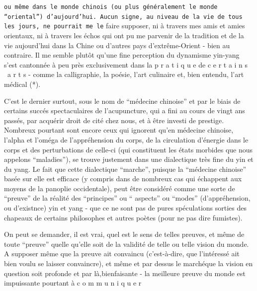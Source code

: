 
\texttt{ou même dans le monde chinois (ou plus généralement le monde ``oriental'') d'aujourd'hui. Aucun signe, au niveau de la vie de tous les jours, ne pourrait me le} faire supposer, ni à travers mes amis et amies orientaux, ni à travers les échos qui ont pu me parvenir de la tradition et de la vie  aujourd'hui dans la Chine ou d'autres pays d'extrême-Orient - bien au contraire. Il me semble plutôt qu'une fine perception du dynamisme yin-yang s'est cantonnée à peu près exclusivement dans la p r a t i q u e de c e r t a i n s \ a r t s - comme la calligraphie, la poésie, l'art culinaire et, bien entendu, l'art médical (*).

C'est le dernier surtout, sous le nom de ``médecine chinoise'' et par le biais de certains succés spectaculaires de l'acupuncture, qui a fini au cours de vingt ans passés, par acquérir droit de cité chez nous, et à être investi de prestige. Nombreux pourtant sont encore ceux qui ignorent qu'en médecine chinoise, l'alpha et l'oméga de l'appréhension du corps, de la circulation d'énergie dans le corps et des perturbations de celle-ci (qui constituent les états morbides que nous appelons ``maladies''), se trouve justement dans une dialectique très fine du yin et du yang. Le fait que cette dialectique ``marche'', puisque la ``médecine chinoise'' basée sur elle est efficace (y compris dans de nombreux cas qui échappent aux moyens de la panoplie occidentale), peut être considéré comme une sorte de ``preuve'' de la réalité des ``principes'' ou `` aspects'' ou ``modes'' (d'appréhension, ou d'existnce) yin et yang - que ce ne sont pas de pures spéculations sorties des chapeaux de certains philosophes et autres poètes (pour ne pas dire fumistes).

On peut se demander, il est vrai, quel est le sens de telles preuves, et même de toute ``preuve'' quelle qu'elle soit de la validité de telle ou telle vision du monde. A supposer même que la preuve ait convaincu (c'est-à-dire, que l'intéressé ait bien voulu se laisser convaincre), et même et par dessus le marché\handwritten{,}que la vision en question soit profonde et par là,bienfaisante - la meilleure preuve du monde est impuissante pourtant à c o m m u n i q u e r


